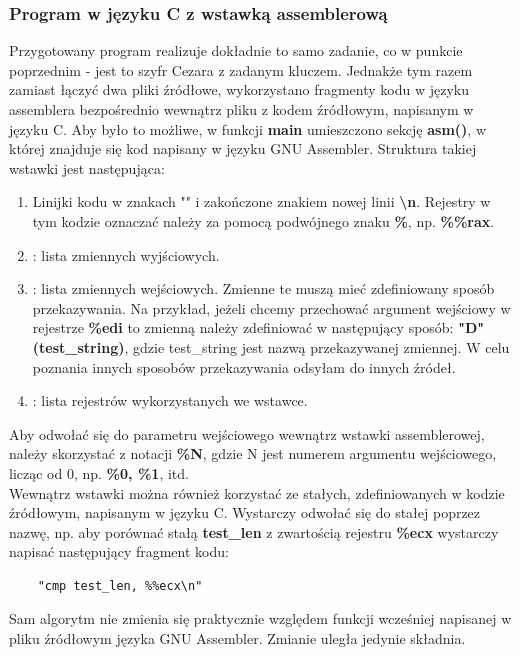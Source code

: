 \documentclass[a4paper,12pt]{article}
\begin{document}
\subsubsection{Program w języku C z wstawką assemblerową}
Przygotowany program realizuje dokładnie to samo zadanie, co w punkcie poprzednim - jest to szyfr Cezara z zadanym kluczem. Jednakże tym razem zamiast łączyć dwa pliki źródłowe, wykorzystano fragmenty kodu w języku assemblera bezpośrednio wewnątrz pliku z kodem źródłowym, napisanym w języku C. Aby było to możliwe, w funkcji \textbf{main} umieszczono sekcję \textbf{asm()}, w której znajduje się kod napisany w języku GNU Assembler. Struktura takiej wstawki jest następująca:
\begin{enumerate}
	\item Linijki kodu w znakach "" i zakończone znakiem nowej linii \textbf{\textbackslash n}. Rejestry w tym kodzie oznaczać należy za pomocą podwójnego znaku \textbf{\%}, np. \textbf{\%\%rax}.
	\item : lista zmiennych wyjściowych.
	\item : lista zmiennych wejściowych. Zmienne te muszą mieć zdefiniowany sposób przekazywania. Na przykład, jeżeli chcemy przechować argument wejściowy w rejestrze \textbf{\%edi} to zmienną należy zdefiniować w następujący sposób: \textbf{"D"(test\_string)}, gdzie test\_string jest nazwą przekazywanej zmiennej. W celu poznania innych sposobów przekazywania odsyłam do innych źródeł. 
	\item : lista rejestrów wykorzystanych we wstawce. 
\end{enumerate}
Aby odwołać się do parametru wejściowego wewnątrz wstawki assemblerowej, należy skorzystać z notacji \textbf{\%N}, gdzie N jest numerem argumentu wejściowego, licząc od 0, np. \textbf{\%0, \%1}, itd.\\
Wewnątrz wstawki można również korzystać ze stałych, zdefiniowanych w kodzie źródłowym, napisanym w języku C. Wystarczy odwołać się do stałej poprzez nazwę, np. aby porównać stałą \textbf{test\_len} z zwartością rejestru \textbf{\%ecx} wystarczy napisać następujący fragment kodu:
\begin{verbatim}
	"cmp test_len, %%ecx\n"
\end{verbatim}
Sam algorytm nie zmienia się praktycznie względem funkcji wcześniej napisanej w pliku źródłowym języka GNU Assembler. Zmianie uległa jedynie składnia.
\end{document}
